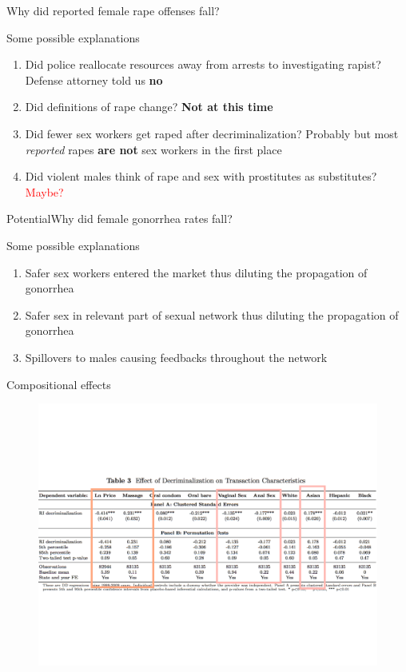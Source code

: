 \documentclass{beamer}
\begin{document}
\begin{frame}{Why did reported female rape offenses fall?}

Some possible explanations

\begin{enumerate}
  \item Did police reallocate resources away from arrests to investigating rapist? Defense attorney told us \textbf{no}
  \item Did definitions of rape change?  \textbf{Not at this time}
  \item Did fewer sex workers get raped after decriminalization? Probably but most \emph{reported} rapes \textbf{are not} sex workers in the first place
  \item Did violent males think of rape and sex with prostitutes as substitutes?  \textcolor{red}{Maybe?}
\end{enumerate}
\end{frame}



\begin{frame}{PotentialWhy did female gonorrhea rates fall?}

Some possible explanations

\begin{enumerate}
  \item Safer sex workers entered the market thus diluting the propagation of gonorrhea 
  \item Safer sex in relevant part of sexual network thus diluting the propagation of gonorrhea
  \item Spillovers to males causing feedbacks throughout the network
\end{enumerate}
\end{frame}

\begin{frame}{Compositional effects}
	\begin{figure}
	\includegraphics[scale=0.4]{./lecture_includes/table3.pdf}
	\end{figure}
\end{frame}
\end{document}
